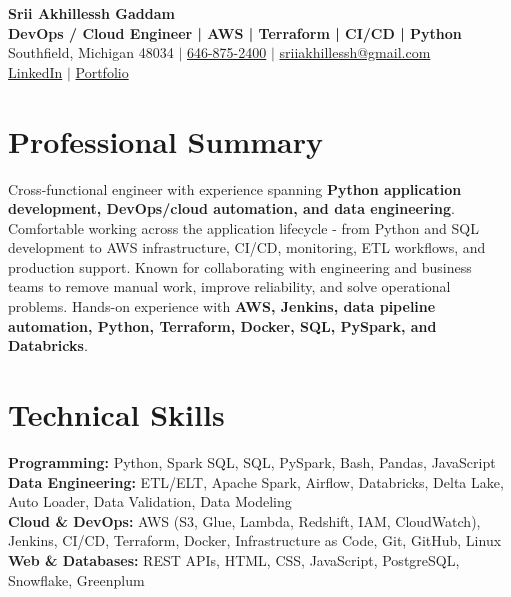 \documentclass[letterpaper,10pt]{article}
\begin{document}
\fontsize{9.35pt}{10.45pt}\selectfont

\begin{center}
    {\LARGE \textbf{Srii Akhillessh Gaddam}} \\[-1pt]
    \textbf{DevOps / Cloud Engineer | AWS | Terraform | CI/CD | Python} \\[2pt]
    Southfield, Michigan 48034 $|$
    \href{tel:6468752400}{646-875-2400} $|$
    \href{mailto:sriiakhillessh@gmail.com}{sriiakhillessh@gmail.com} \\[1pt]
    \href{https://www.linkedin.com/in/srii-akhiilessh-gaddam-b48668191/}{LinkedIn} $|$
    \href{https://sriiakhillesshg.github.io/portfolio/}{Portfolio}
\end{center}
\vspace{-8pt}

\section{Professional Summary}
\small{Cross-functional engineer with experience spanning \textbf{Python application development, DevOps/cloud automation, and data engineering}. Comfortable working across the application lifecycle - from Python and SQL development to AWS infrastructure, CI/CD, monitoring, ETL workflows, and production support. Known for collaborating with engineering and business teams to remove manual work, improve reliability, and solve operational problems. Hands-on experience with \textbf{AWS, Jenkins, data pipeline automation, Python, Terraform, Docker, SQL, PySpark, and Databricks}.}

\section{Technical Skills}
\small{
\textbf{Programming:} Python, Spark SQL, SQL, PySpark, Bash, Pandas, JavaScript \\
\textbf{Data Engineering:} ETL/ELT, Apache Spark, Airflow, Databricks, Delta Lake, Auto Loader, Data Validation, Data Modeling \\
\textbf{Cloud \& DevOps:} AWS (S3, Glue, Lambda, Redshift, IAM, CloudWatch), Jenkins, CI/CD, Terraform, Docker, Infrastructure as Code, Git, GitHub, Linux \\
\textbf{Web \& Databases:} REST APIs, HTML, CSS, JavaScript, PostgreSQL, Snowflake, Greenplum
}
\end{document}
